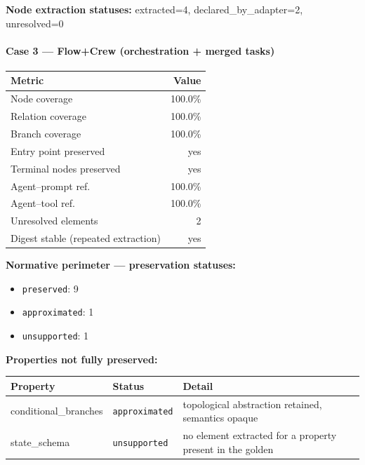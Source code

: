 \documentclass[10pt]{article}
\newcommand{\statuspreserved}{\textcolor{preservedgreen}{\texttt{preserved}}}
\newcommand{\statusapproximated}{\textcolor{approximatedorange}{\texttt{approximated}}}
\newcommand{\statusunsupported}{\textcolor{unsupportedgray}{\texttt{unsupported}}}
\begin{document}
\textbf{Node extraction statuses:} extracted=4, declared\_by\_adapter=2, unresolved=0

\paragraph{Case 3 --- Flow+Crew (orchestration + merged tasks)}

\begin{table}[htbp]
	\centering
	\begin{tabular}{@{}lr@{}}
		\toprule
		\textbf{Metric} & \textbf{Value} \\
		\midrule
		Node coverage & 100.0\% \\
		Relation coverage & 100.0\% \\
		Branch coverage & 100.0\% \\
		Entry point preserved & yes \\
		Terminal nodes preserved & yes \\
		Agent--prompt ref. & 100.0\% \\
		Agent--tool ref. & 100.0\% \\
		Unresolved elements & 2 \\
		Digest stable (repeated extraction) & yes \\
		\bottomrule
	\end{tabular}
\end{table}

\textbf{Normative perimeter --- preservation statuses:}
\begin{itemize}[nosep]
	\item \statuspreserved{}: 9
	\item \statusapproximated{}: 1
	\item \statusunsupported{}: 1
\end{itemize}

\textbf{Properties not fully preserved:}

\begin{table}[htbp]
	\centering
	\small
	\begin{tabular}{@{}llp{8cm}@{}}
		\toprule
		\textbf{Property} & \textbf{Status} & \textbf{Detail} \\
		\midrule
		conditional\_branches & \statusapproximated{} & topological abstraction retained, semantics opaque \\
		state\_schema & \statusunsupported{} & no element extracted for a property present in the golden \\
		\bottomrule
	\end{tabular}
\end{table}
\end{document}
